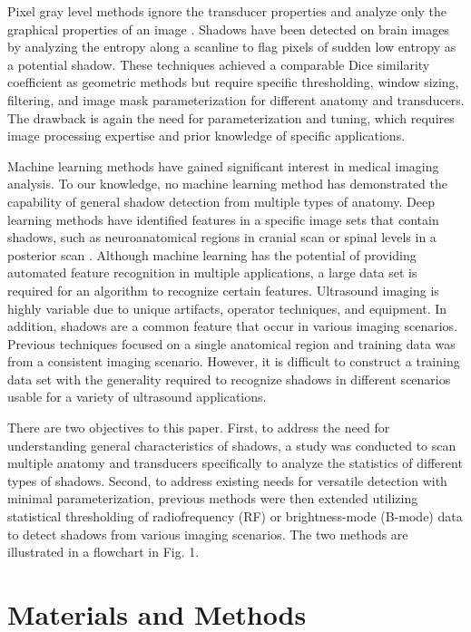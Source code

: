 \documentclass[authoryear,preprint,review,12pt]{elsarticle}
\begin{document}
Pixel gray level methods ignore the transducer properties and analyze only the graphical properties of an image \citep{Hellier2010}. Shadows have been detected on brain images by analyzing the entropy along a scanline to flag pixels of sudden low entropy as a potential shadow. These techniques achieved a comparable Dice similarity coefficient as geometric methods but require specific thresholding, window sizing, filtering, and image mask parameterization for different anatomy and transducers. The drawback is again the need for parameterization and tuning, which requires image processing expertise and prior knowledge of specific applications.

Machine learning methods have gained significant interest in medical imaging analysis. To our knowledge, no machine learning method has demonstrated the capability of general shadow detection from multiple types of anatomy. Deep learning methods have identified features in a specific image sets that contain shadows, such as neuroanatomical regions in cranial scan \citep{Milletari2017} or spinal levels in a posterior scan \citep{Hetherington2017}. Although machine learning has the potential of providing automated feature recognition in multiple applications, a large data set is required for an algorithm to recognize certain features. Ultrasound imaging is highly variable due to unique artifacts, operator techniques, and equipment. In addition, shadows are a common feature that occur in various imaging scenarios. Previous techniques focused on a single anatomical region and training data was from a consistent imaging scenario. However, it is difficult to construct a training data set with the generality required to recognize shadows in different scenarios usable for a variety of ultrasound applications.

There are two objectives to this paper. First, to address the need for understanding general characteristics of shadows, a study was conducted to scan multiple anatomy and transducers specifically to analyze the statistics of different types of shadows. Second, to address existing needs for versatile detection with minimal parameterization, previous methods were then extended utilizing statistical thresholding of radiofrequency (RF) or brightness-mode (B-mode) data to detect shadows from various imaging scenarios. The two methods are illustrated in a flowchart in Fig. 1.

\section*{Materials and Methods}
\label{MaM}
\end{document}
